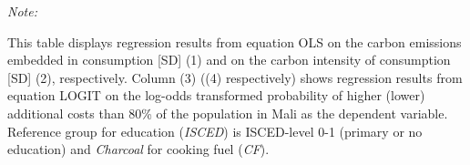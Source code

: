 \begin{table}[htbp!]
\begin{adjustbox}{width = 1\textwidth, max height = 0.95\textheight, center}
\begin{threeparttable}[b]
         \begin{tablenotes}\item \medskip \textit{Note:}
            \item This table displays regression results from equation OLS on the carbon emissions embedded in consumption [SD] (1) and on the carbon intensity of consumption [SD] (2), respectively. 
                                      Column (3) ((4) respectively) shows regression results from equation LOGIT on the log-odds transformed probability of higher (lower) additional costs than 80\% of the population in Mali as the dependent variable. Reference group for education (\textit{ISCED}) is ISCED-level 0-1 (primary or no education) and \textit{Charcoal} for cooking fuel (\textit{CF}).
         \end{tablenotes}
      \end{threeparttable}
   \end{adjustbox}
\end{table}


